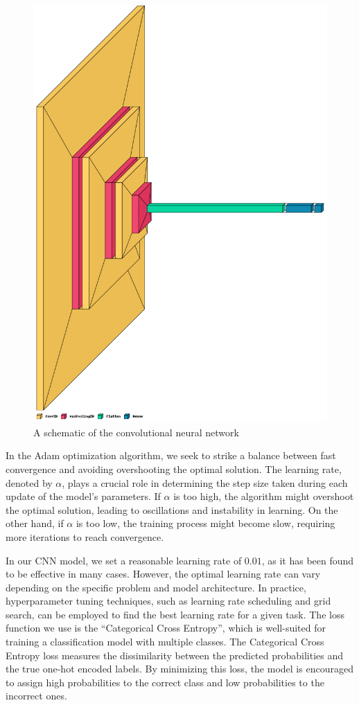 \documentclass[11pt,a4paper]{article}
\begin{document}
 \begin{figure}[h!]
 \centering
  \includegraphics[width=0.85\linewidth]{schema.png}
  \caption{A schematic of the convolutional neural network}
  \label{schema}
\end{figure}

In the Adam optimization algorithm, we seek to strike a balance between fast convergence and avoiding overshooting the optimal solution. The learning rate, denoted by $\alpha$, plays a crucial role in determining the step size taken during each update of the model's parameters. If $\alpha$ is too high, the algorithm might overshoot the optimal solution, leading to oscillations and instability in learning. On the other hand, if $\alpha$ is too low, the training process might become slow, requiring more iterations to reach convergence.

In our CNN model, we set a reasonable learning rate of $0.01$, as it has been found to be effective in many cases. However, the optimal learning rate can vary depending on the specific problem and model architecture. In practice, hyperparameter tuning techniques, such as learning rate scheduling and grid search, can be employed to find the best learning rate for a given task. The loss function we use is the ``Categorical Cross Entropy'', which is well-suited for training a classification model with multiple classes. The Categorical Cross Entropy loss measures the dissimilarity between the predicted probabilities and the true one-hot encoded labels. By minimizing this loss, the model is encouraged to assign high probabilities to the correct class and low probabilities to the incorrect ones.
\end{document}
